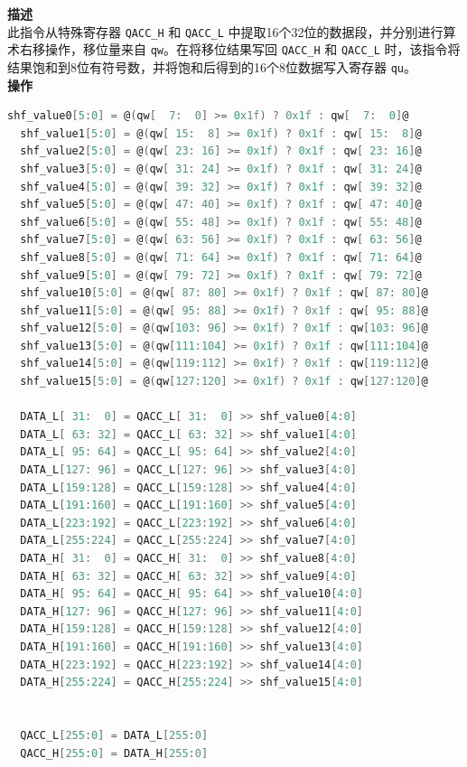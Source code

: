 \textbf{描述}\\
此指令从特殊寄存器 \lstinline{QACC_H} 和 \lstinline{QACC_L} 中提取16个32位的数据段，并分别进行算术右移操作，移位量来自 \lstinline{qw}。在将移位结果写回 \lstinline{QACC_H} 和 \lstinline{QACC_L} 时，该指令将结果饱和到8位有符号数，并将饱和后得到的16个8位数据写入寄存器 \lstinline{qu}。\\
\textbf{操作}
\begin{lstlisting}[language=C, escapechar=@]
  shf_value0[5:0] = @(qw[  7:  0] >= 0x1f) ? 0x1f : qw[  7:  0]@
  shf_value1[5:0] = @(qw[ 15:  8] >= 0x1f) ? 0x1f : qw[ 15:  8]@
  shf_value2[5:0] = @(qw[ 23: 16] >= 0x1f) ? 0x1f : qw[ 23: 16]@
  shf_value3[5:0] = @(qw[ 31: 24] >= 0x1f) ? 0x1f : qw[ 31: 24]@
  shf_value4[5:0] = @(qw[ 39: 32] >= 0x1f) ? 0x1f : qw[ 39: 32]@
  shf_value5[5:0] = @(qw[ 47: 40] >= 0x1f) ? 0x1f : qw[ 47: 40]@
  shf_value6[5:0] = @(qw[ 55: 48] >= 0x1f) ? 0x1f : qw[ 55: 48]@
  shf_value7[5:0] = @(qw[ 63: 56] >= 0x1f) ? 0x1f : qw[ 63: 56]@
  shf_value8[5:0] = @(qw[ 71: 64] >= 0x1f) ? 0x1f : qw[ 71: 64]@
  shf_value9[5:0] = @(qw[ 79: 72] >= 0x1f) ? 0x1f : qw[ 79: 72]@
  shf_value10[5:0] = @(qw[ 87: 80] >= 0x1f) ? 0x1f : qw[ 87: 80]@
  shf_value11[5:0] = @(qw[ 95: 88] >= 0x1f) ? 0x1f : qw[ 95: 88]@
  shf_value12[5:0] = @(qw[103: 96] >= 0x1f) ? 0x1f : qw[103: 96]@
  shf_value13[5:0] = @(qw[111:104] >= 0x1f) ? 0x1f : qw[111:104]@
  shf_value14[5:0] = @(qw[119:112] >= 0x1f) ? 0x1f : qw[119:112]@
  shf_value15[5:0] = @(qw[127:120] >= 0x1f) ? 0x1f : qw[127:120]@

  DATA_L[ 31:  0] = QACC_L[ 31:  0] >> shf_value0[4:0]
  DATA_L[ 63: 32] = QACC_L[ 63: 32] >> shf_value1[4:0]
  DATA_L[ 95: 64] = QACC_L[ 95: 64] >> shf_value2[4:0]
  DATA_L[127: 96] = QACC_L[127: 96] >> shf_value3[4:0]
  DATA_L[159:128] = QACC_L[159:128] >> shf_value4[4:0]
  DATA_L[191:160] = QACC_L[191:160] >> shf_value5[4:0]
  DATA_L[223:192] = QACC_L[223:192] >> shf_value6[4:0]
  DATA_L[255:224] = QACC_L[255:224] >> shf_value7[4:0]
  DATA_H[ 31:  0] = QACC_H[ 31:  0] >> shf_value8[4:0]
  DATA_H[ 63: 32] = QACC_H[ 63: 32] >> shf_value9[4:0]
  DATA_H[ 95: 64] = QACC_H[ 95: 64] >> shf_value10[4:0]
  DATA_H[127: 96] = QACC_H[127: 96] >> shf_value11[4:0]
  DATA_H[159:128] = QACC_H[159:128] >> shf_value12[4:0]
  DATA_H[191:160] = QACC_H[191:160] >> shf_value13[4:0]
  DATA_H[223:192] = QACC_H[223:192] >> shf_value14[4:0]
  DATA_H[255:224] = QACC_H[255:224] >> shf_value15[4:0]


  QACC_L[255:0] = DATA_L[255:0]
  QACC_H[255:0] = DATA_H[255:0]


\end{lstlisting}

